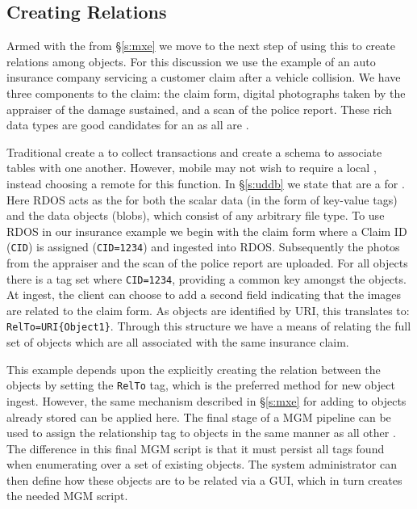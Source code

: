 \subsection{Creating Relations} \label{s:cr}
Armed with the \md{} from \S\ref{s:mxe} we move to the next step of using this \md{} to create relations among objects. For this discussion we use the example of an auto insurance company servicing a customer claim after a vehicle collision. We have three components to the claim: the claim form, digital photographs taken by the appraiser of the damage sustained, and a scan of the police report. These rich data types are good candidates for an \os{} as all are \ud{}.

Traditional \apps{} create a \db{} to collect transactions and create a schema to associate\db{} tables with one another. However, mobile \apps{} may not wish to require a local \db{}, instead choosing a remote \db{} for this function. In \S\ref{s:uddb} we state that \oss{} are a \db{} for \ud{}. Here RDOS acts as the \db{} for both the scalar data (in the form of key-value \md{} tags) and the data objects (blobs), which consist of any arbitrary file type. To use RDOS in our insurance example we begin with the claim form where a Claim ID (\texttt{CID}) is assigned (\texttt{CID=1234}) and ingested into RDOS. Subsequently the photos from the appraiser and the scan of the police report are uploaded. For all objects there is a \md{} tag set where \texttt{CID=1234}, providing a common key amongst the objects. At ingest, the client \app{} can choose to add a second \md{} field indicating that the images are related to the claim form. As objects are identified by URI, this translates to: \texttt{RelTo=URI\{Object1\}}. Through this structure we have a means of relating the full set of objects which are all associated with the same insurance claim.

This example depends upon the \app{} explicitly creating the relation between the objects by setting the \texttt{RelTo} \md{} tag, which is the preferred method for new object ingest. However, the same mechanism described in \S\ref{s:mxe} for adding \md{} to objects already stored can be applied here. The final stage of a MGM pipeline can be used to assign the relationship tag to objects in the same manner as all other \md{}. The difference in this final MGM script is that it must persist all \md{} tags found when enumerating over a set of existing objects. The system administrator can then define how these objects are to be related via a GUI, which in turn creates the needed MGM script.
